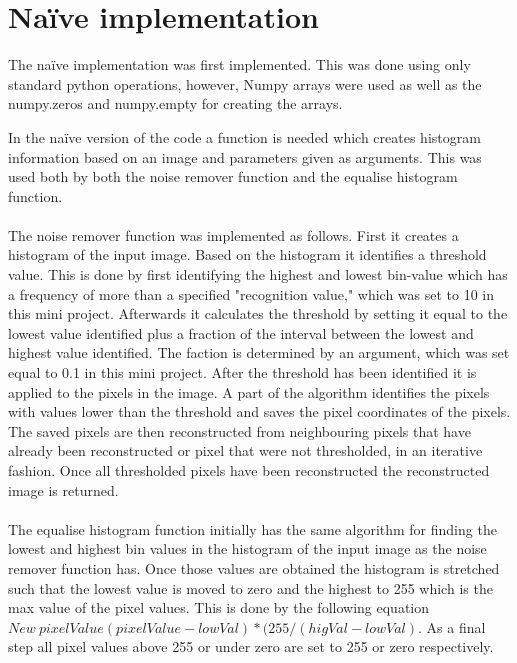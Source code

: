 \section{Na\"ive implementation}
The na\"ive implementation was first implemented. This was done using only standard python operations, however, Numpy arrays were used as well as the numpy.zeros and numpy.empty for creating the arrays. 

In the na\"ive version of the code a function is needed which creates histogram information based on an image and parameters given as arguments. This was used both by both the noise remover function and the equalise histogram function. \\\\
The noise remover function was implemented as follows. First it creates a histogram of the input image. 
Based on the histogram it identifies a threshold value. This is done by first identifying the highest and lowest bin-value which has a frequency of more than a specified "recognition value," which was set to 10 in this mini project. Afterwards it calculates the threshold by setting it equal to the lowest value identified plus a fraction of the interval between the lowest and highest value identified. The faction is determined by an argument, which was set equal to 0.1 in this mini project. After the threshold has been identified it is applied to the pixels in the image. A part of the algorithm identifies the pixels with values lower than the threshold and saves the pixel coordinates of the pixels. The saved pixels are then reconstructed from neighbouring pixels that have already been reconstructed or pixel that were not thresholded, in an iterative fashion. Once all thresholded pixels have been reconstructed the reconstructed image is returned. \\\\
The equalise histogram function initially has the same algorithm for finding the lowest and highest bin values in the histogram of the input image as the noise remover function has. Once those values are obtained the histogram is stretched such that the lowest value is moved to zero and the highest to 255 which is the max value of the pixel values. This is done by the following equation $New~pixelValue (pixelValue-lowVal)*(255/(higVal-lowVal)$. As a final step all pixel values above 255 or under zero are set to 255 or zero respectively.


